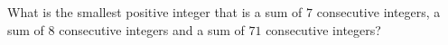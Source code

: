 What is the smallest positive integer that is a sum of $7$ consecutive integers, a sum of $8$ consecutive integers and a sum of $71$ consecutive integers?
